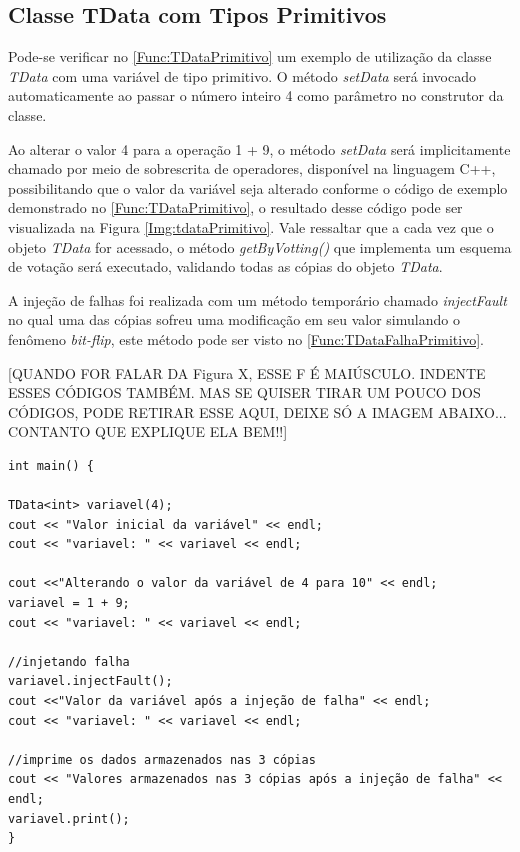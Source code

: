 \subsection{Classe TData com Tipos Primitivos} \label{subsec:TDataPrimitivo}

Pode-se verificar no \autoref{Func:TDataPrimitivo} um exemplo de utilização da classe \textit{TData} com uma variável de tipo primitivo. O método \textit{setData} será invocado automaticamente ao passar o número inteiro 4 como parâmetro no construtor da classe. 

Ao alterar o valor 4 para a operação 1 + 9, o método \textit{setData} será implicitamente chamado por meio de sobrescrita de operadores, disponível na linguagem C++, possibilitando que o valor da variável seja alterado conforme o código de exemplo demonstrado no \autoref{Func:TDataPrimitivo}, o resultado desse código pode ser visualizada na Figura \ref{Img:tdataPrimitivo}. Vale ressaltar que a cada vez que o objeto \textit{TData} for acessado, o método \textit{getByVotting()} que implementa um esquema de votação será executado, validando todas as cópias do objeto \textit{TData}. 

A injeção de falhas foi realizada com um método temporário chamado \textit{injectFault} no qual uma das cópias sofreu uma modificação em seu valor simulando o fenômeno \textit{bit-flip}, este método pode ser visto no \autoref{Func:TDataFalhaPrimitivo}.

[QUANDO FOR FALAR DA Figura X, ESSE F É MAIÚSCULO. INDENTE ESSES CÓDIGOS TAMBÉM. MAS SE QUISER TIRAR UM POUCO DOS CÓDIGOS, PODE RETIRAR ESSE AQUI, DEIXE SÓ A IMAGEM ABAIXO... CONTANTO QUE EXPLIQUE ELA BEM!!]

\begin{lstlisting}[label=Func:TDataPrimitivo,caption={[Exemplo de utilização da classe TData para variáveis de tipo primitivo.]Exemplo de utilização da classe TData para variáveis do tipo primitivo.}]
int main() {

TData<int> variavel(4);
cout << "Valor inicial da variável" << endl;
cout << "variavel: " << variavel << endl;

cout <<"Alterando o valor da variável de 4 para 10" << endl;
variavel = 1 + 9;
cout << "variavel: " << variavel << endl;

//injetando falha
variavel.injectFault();
cout <<"Valor da variável após a injeção de falha" << endl;
cout << "variavel: " << variavel << endl;

//imprime os dados armazenados nas 3 cópias
cout << "Valores armazenados nas 3 cópias após a injeção de falha" << endl;
variavel.print();
}
\end{lstlisting}

